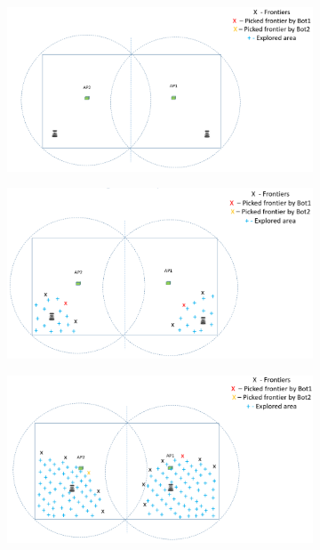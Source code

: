 \begin{figure}
    \begin{subfigure}[b]{0.495\textwidth}
		\includegraphics[width=\textwidth, height=0.6\textwidth]{images/wm1.png}
		\label{subfig:a} 
		\caption{}
	\end{subfigure}
	\begin{subfigure}[b]{0.495\textwidth}
		\includegraphics[width=\textwidth, height=0.6\textwidth]{images/wm2.png}
		\label{subfig:b}
		\caption{}
	\end{subfigure}
	\begin{subfigure}[b]{0.495\textwidth}
		\includegraphics[width=\textwidth, height=0.6\textwidth]{images/wm3.png}

\end{subfigure}
\end{figure}
